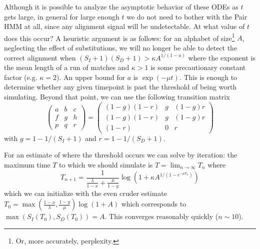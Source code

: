 \documentclass{article}
\begin{document}
Although it is possible to analyze the asymptotic behavior of these ODEs as $t$ gets large,
in general for large enough $t$ we do not need to bother with the Pair HMM at all, since any alignment signal will be undetectable.
At what value of $t$ does this occur? A heuristic argument is as follows:
for an alphabet of size\footnote{Or, more accurately, perplexity.} $A$, neglecting the effect of substitutions,
we will no longer be able to detect the correct alignment when $(S_I+1)(S_D+1) > \kappa A^{1/(1-a)}$ where the exponent is the mean length of a run of matches
and $\kappa>1$ is some precautionary constant factor (e.g. $\kappa=2$).
An upper bound for $a$ is $\exp(-\mu t)$.
This is enough to determine whether any given timepoint is past the threshold of being worth simulating.
Beyond that point, we can use the following transition matrix
\[
\begin{pmatrix}
a & b & c \\
f & g & h \\
p & q & r 
\end{pmatrix}
=
\begin{pmatrix}
(1-g)(1-r) & g & (1-g)r \\
(1-g)(1-r) & g & (1-g)r \\
(1-r) & 0 & r
\end{pmatrix}
\]
with $g=1-1/(S_I+1)$ and $r=1-1/(S_D+1)$.

For an estimate of where the threshold occurs we can solve by iteration:
the maximum time $T$ to which we should simulate is $T = \lim_{n \to \infty} T_n$ where
\[
T_{n+1} = \frac{1}{\frac{\lambda}{1-x} + \frac{\mu}{1-y}} \log \left( 1 + \kappa A^{1/\left( 1 - e^{-\mu T_n} \right)} \right)
\]
which we can initialize with the even cruder estimate $T_0 = \max \left( \frac{1-x}{\lambda}, \frac{1-y}{\mu} \right) \log( 1 + A )$ which corresponds to $\max\left(S_I(T_0),S_D(T_0)\right)=A$.
This converges reasonably quickly ($n \sim 10$).
\end{document}
